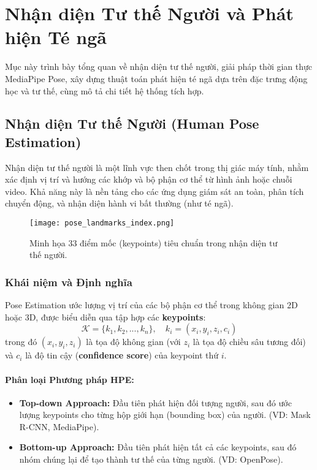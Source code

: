 \section{Nhận diện Tư thế Người và Phát hiện Té ngã}
\label{sec:pose_fall_system}

Mục này trình bày tổng quan về nhận diện tư thế người, giải pháp thời gian thực MediaPipe Pose, xây dựng thuật toán phát hiện té ngã dựa trên đặc trưng động học và tư thế, cùng mô tả chi tiết hệ thống tích hợp.

\subsection{Nhận diện Tư thế Người (Human Pose Estimation)}

Nhận diện tư thế người là một lĩnh vực then chốt trong thị giác máy tính, nhằm xác định vị trí và hướng các khớp và bộ phận cơ thể từ hình ảnh hoặc chuỗi video. Khả năng này là nền tảng cho các ứng dụng giám sát an toàn, phân tích chuyển động, và nhận diện hành vi bất thường (như té ngã).


\begin{figure}[H]
    \centering
    \texttt{[image: pose\_landmarks\_index.png]}
    \caption{Minh họa 33 điểm mốc (keypoints) tiêu chuẩn trong nhận diện tư thế người.}
\end{figure}

\subsubsection{Khái niệm và Định nghĩa}

Pose Estimation ước lượng vị trí của các bộ phận cơ thể trong không gian 2D hoặc 3D, được biểu diễn qua tập hợp các \textbf{keypoints}:
\begin{equation}
\mathcal{K} = \{k_1, k_2, ..., k_n\}, \quad k_i = (x_i, y_i, z_i, c_i)
\end{equation}
trong đó $(x_i, y_i, z_i)$ là tọa độ không gian (với $z_i$ là tọa độ chiều sâu tương đối) và $c_i$ là độ tin cậy (\textbf{confidence score}) của keypoint thứ $i$.

\paragraph{Phân loại Phương pháp HPE:}
\begin{itemize}
    \item \textbf{Top-down Approach:} Đầu tiên phát hiện đối tượng người, sau đó ước lượng keypoints cho từng hộp giới hạn (bounding box) của người. (VD: Mask R-CNN, MediaPipe).
    \item \textbf{Bottom-up Approach:} Đầu tiên phát hiện tất cả các keypoints, sau đó nhóm chúng lại để tạo thành tư thế của từng người. (VD: OpenPose).
\end{itemize}

